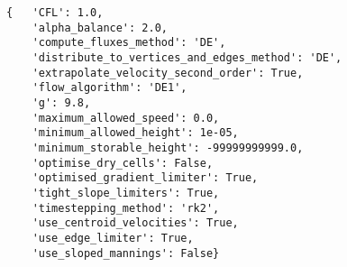 \begin{verbatim}
{   'CFL': 1.0,
    'alpha_balance': 2.0,
    'compute_fluxes_method': 'DE',
    'distribute_to_vertices_and_edges_method': 'DE',
    'extrapolate_velocity_second_order': True,
    'flow_algorithm': 'DE1',
    'g': 9.8,
    'maximum_allowed_speed': 0.0,
    'minimum_allowed_height': 1e-05,
    'minimum_storable_height': -99999999999.0,
    'optimise_dry_cells': False,
    'optimised_gradient_limiter': True,
    'tight_slope_limiters': True,
    'timestepping_method': 'rk2',
    'use_centroid_velocities': True,
    'use_edge_limiter': True,
    'use_sloped_mannings': False}
\end{verbatim}
